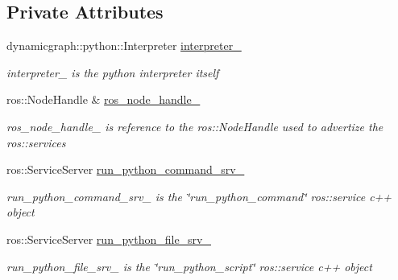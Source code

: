 \subsection*{Private Attributes}
\begin{DoxyCompactItemize}
\item 
dynamicgraph\+::python\+::\+Interpreter \hyperlink{classdynamic__graph_1_1RosPythonInterpreter_a1e4f91705887914b6e5f649b2fb7fcfa}{interpreter\+\_\+}\hypertarget{classdynamic__graph_1_1RosPythonInterpreter_a1e4f91705887914b6e5f649b2fb7fcfa}{}\label{classdynamic__graph_1_1RosPythonInterpreter_a1e4f91705887914b6e5f649b2fb7fcfa}

\begin{DoxyCompactList}\small\item\em interpreter\+\_\+ is the python interpreter itself \end{DoxyCompactList}\item 
ros\+::\+Node\+Handle \& \hyperlink{classdynamic__graph_1_1RosPythonInterpreter_ac0ff23f78488bfcbaa6afaae75ec5a8e}{ros\+\_\+node\+\_\+handle\+\_\+}\hypertarget{classdynamic__graph_1_1RosPythonInterpreter_ac0ff23f78488bfcbaa6afaae75ec5a8e}{}\label{classdynamic__graph_1_1RosPythonInterpreter_ac0ff23f78488bfcbaa6afaae75ec5a8e}

\begin{DoxyCompactList}\small\item\em ros\+\_\+node\+\_\+handle\+\_\+ is reference to the ros\+::\+Node\+Handle used to advertize the ros\+::services \end{DoxyCompactList}\item 
ros\+::\+Service\+Server \hyperlink{classdynamic__graph_1_1RosPythonInterpreter_a10b59f74957922f74e84709b2a6920da}{run\+\_\+python\+\_\+command\+\_\+srv\+\_\+}
\begin{DoxyCompactList}\small\item\em run\+\_\+python\+\_\+command\+\_\+srv\+\_\+ is the \char`\"{}run\+\_\+python\+\_\+command\char`\"{} ros\+::service c++ object \end{DoxyCompactList}\item 
ros\+::\+Service\+Server \hyperlink{classdynamic__graph_1_1RosPythonInterpreter_aebb8e4197d11cef0bd49b613b761e081}{run\+\_\+python\+\_\+file\+\_\+srv\+\_\+}
\begin{DoxyCompactList}\small\item\em run\+\_\+python\+\_\+file\+\_\+srv\+\_\+ is the \char`\"{}run\+\_\+python\+\_\+script\char`\"{} ros\+::service c++ object \end{DoxyCompactList}\end{DoxyCompactItemize}


